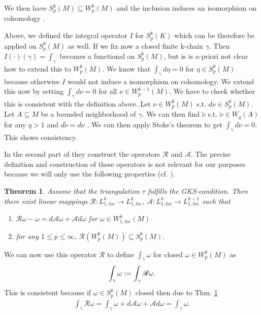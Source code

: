 \documentclass[12pt,a4paper]{article}
\newtheorem{theorem}{Theorem}
\newcommand{\rop}{\mathscr{R}} %
\begin{document}
We then have $S^k_p(M) \subseteq W^k_p(M)$ and the inclusion induces an
isomorphism on cohomology \cite[Lemma 4, Corollary]{goldshtein}. 


Above, we defined the integral operator $I$ for $S^k_p(K)$ which can be 
therefore be applied on $S^k_p(M)$ as well. If we fix now a closed finite 
k-chain $\gamma$. Then $I(\cdot)(\gamma) = \int_\gamma$ becomes a functional on
$S^k_p(M)$, but is is a-priori not clear how to extend this to $W_p^k(M)$. 
We know that $\int_\gamma d\eta = 0$ for $\eta \in S^k_p(M)$ because 
otherwise $I$ would not induce a isomorphism on cohomology. We extend this now
by setting $\int_\gamma d\nu = 0$ for all $\nu \in W^{k-1}_p(M)$. 
We have to check whether this is consistent with the definition above. 
Let $\nu \in W_p^k(M)$ s.t. $d\nu \in S^k_p(M)$. Let $A \subseteq M$ be a 
bounded neighborhood of $\gamma$. We can then find 
$\tilde{\nu}$ s.t.  $\tilde{\nu} \in W_q(A)$ for any $q > 1$ and 
$d\tilde{\nu} = d\nu$ \cite[Thm 3.1.1]{schwarz}. We can then apply 
Stoke's theorem \cite[Thm. 9]{goldshtein_integration} to get  
$\int_\gamma d\nu = 0$. This shows consistency.

In the second part of \cite{goldshtein} they construct the operators
$\mathscr{R}$ and $\mathscr{A}$. The precise definition and construction of
these operators is not relevant for our purposes because we will only use
the following properties (cf. \cite[Thm.2]{goldshtein}).

\begin{theorem}\label{operators}
    Assume that the triangulation $\tau$ fulfills the GKS-condition.
    Then there exist linear mappings $\mathscr{R}: L^k_{1,loc} \rightarrow 
    L^k_{1,loc}$, $\mathscr{A}: L^k_{1,loc} \rightarrow L^{k-1}_{1,loc}$ 
    such that
    \begin{enumerate}
        \item $\mathscr{R}\omega - \omega = 
            d\mathscr{A}\omega + \mathscr{A}d\omega$ for 
            $\omega \in W^k_{1,loc}(M)$
        \item for any $1 \leq p \leq \infty$, 
            $\rop(W^k_p(M)) \subseteq S^k_p(M)$.
    \end{enumerate}
\end{theorem}

We can now use this operator $\rop$ to define $\int_\gamma \omega$ for closed
$\omega \in W^k_p(M)$ as
\begin{align*}
\int_\gamma \omega \vcentcolon= \int_\gamma \rop\omega.
\end{align*}
This is consistent because if $\omega \in S^k_p(M)$ closed then due to 
Thm. \ref{operators}
\begin{align*}
\int_\gamma \rop\omega = 
\int_\gamma \omega + d\mathscr{A}\omega + \mathscr{A}d\omega = 
\int_\gamma \omega.
\end{align*}
\end{document}
